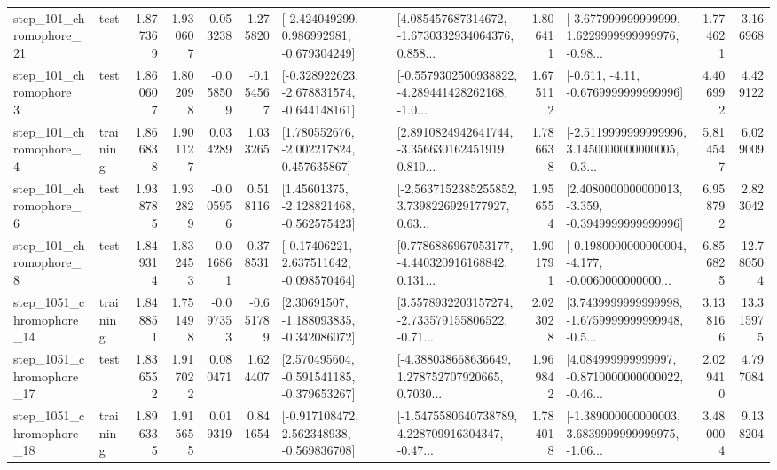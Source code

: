 \begin{tabular}{llrrrrllrlrr}
  step\_101\_chromophore\_21 &      test &      1.877369 &    1.930607 &      0.053238 &  1.275820 &   [-2.424049299, 0.986992981, -0.679304249] &  [4.085457687314672, -1.6730332934064376, 0.858... &       1.806411 &  [-3.677999999999999, 1.6229999999999976, -0.98... &            1.774621 &          3.166968 \\
   step\_101\_chromophore\_3 &      test &      1.860607 &    1.802098 &     -0.058509 & -0.154567 &  [-0.328922623, -2.678831574, -0.644148161] &  [-0.5579302500938822, -4.289441428262168, -1.0... &       1.675112 &               [-0.611, -4.11, -0.6769999999999996] &            4.406992 &          4.429122 \\
   step\_101\_chromophore\_4 &  training &      1.866838 &    1.901127 &      0.034289 &  1.033265 &    [1.780552676, -2.002217824, 0.457635867] &  [2.8910824942641744, -3.356630162451919, 0.810... &       1.786638 &  [-2.5119999999999996, 3.1450000000000005, -0.3... &            5.814547 &          6.029009 \\
   step\_101\_chromophore\_6 &      test &      1.938785 &    1.932829 &     -0.005956 &  0.518116 &    [1.45601375, -2.128821468, -0.562575423] &  [-2.5637152385255852, 3.7398226929177927, 0.63... &       1.956554 &  [2.4080000000000013, -3.359, -0.3949999999999996] &            6.958792 &          2.823042 \\
   step\_101\_chromophore\_8 &      test &      1.849314 &    1.832453 &     -0.016861 &  0.378531 &    [-0.17406221, 2.637511642, -0.098570464] &  [0.7786886967053177, -4.440320916168842, 0.131... &       1.901791 &  [-0.1980000000000004, -4.177, -0.0060000000000... &            6.856825 &         12.780504 \\
 step\_1051\_chromophore\_14 &  training &      1.848851 &    1.751498 &     -0.097353 & -0.651789 &    [2.30691507, -1.188093835, -0.342086072] &  [3.5578932203157274, -2.733579155806522, -0.71... &       2.023028 &  [3.7439999999999998, -1.6759999999999948, -0.5... &            3.138166 &         13.315975 \\
 step\_1051\_chromophore\_17 &      test &      1.836552 &    1.917022 &      0.080471 &  1.624407 &   [2.570495604, -0.591541185, -0.379653267] &  [-4.388038668636649, 1.278752707920665, 0.7030... &       1.969842 &  [4.084999999999997, -0.8710000000000022, -0.46... &            2.029410 &          4.797084 \\
 step\_1051\_chromophore\_18 &  training &      1.896335 &    1.915655 &      0.019319 &  0.841654 &   [-0.917108472, 2.562348938, -0.569836708] &  [-1.5475580640738789, 4.228709916304347, -0.47... &       1.784018 &  [-1.389000000000003, 3.6839999999999975, -1.06... &            3.480004 &          9.138204 \\

\end{tabular}
